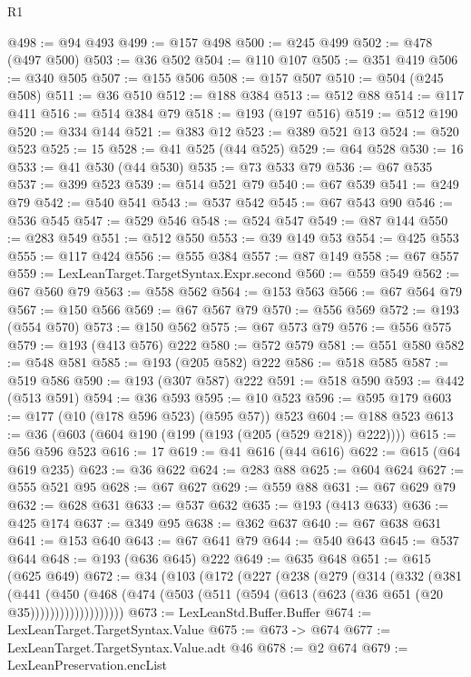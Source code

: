 \begin{lexlean}{R1}
\begin{coremodule}
@498 := @94 @493
@499 := @157 @498
@500 := @245 @499
@502 := @478 (@497 @500)
@503 := @36 @502
@504 := @110 @107
@505 := @351 @419
@506 := @340 @505
@507 := @155 @506
@508 := @157 @507
@510 := @504 (@245 @508)
@511 := @36 @510
@512 := @188 @384
@513 := @512 @88
@514 := @117 @411
@516 := @514 @384 @79
@518 := @193 (@197 @516)
@519 := @512 @190
@520 := @334 @144
@521 := @383 @12
@523 := @389 @521 @13
@524 := @520 @523
@525 := 15
@528 := @41 @525 (@44 @525)
@529 := @64 @528
@530 := 16
@533 := @41 @530 (@44 @530)
@535 := @73 @533 @79
@536 := @67 @535
@537 := @399 @523
@539 := @514 @521 @79
@540 := @67 @539
@541 := @249 @79
@542 := @540 @541
@543 := @537 @542
@545 := @67 @543 @90
@546 := @536 @545
@547 := @529 @546
@548 := @524 @547
@549 := @87 @144
@550 := @283 @549
@551 := @512 @550
@553 := @39 @149 @53
@554 := @425 @553
@555 := @117 @424
@556 := @555 @384
@557 := @87 @149
@558 := @67 @557
@559 := LexLeanTarget.TargetSyntax.Expr.second
@560 := @559 @549
@562 := @67 @560 @79
@563 := @558 @562
@564 := @153 @563
@566 := @67 @564 @79
@567 := @150 @566
@569 := @67 @567 @79
@570 := @556 @569
@572 := @193 (@554 @570)
@573 := @150 @562
@575 := @67 @573 @79
@576 := @556 @575
@579 := @193 (@413 @576) @222
@580 := @572 @579
@581 := @551 @580
@582 := @548 @581
@585 := @193 (@205 @582) @222
@586 := @518 @585
@587 := @519 @586
@590 := @193 (@307 @587) @222
@591 := @518 @590
@593 := @442 (@513 @591)
@594 := @36 @593
@595 := @10 @523
@596 := @595 @179
@603 := @177 (@10 (@178 @596 @523) (@595 @57)) @523
@604 := @188 @523
@613 := @36 (@603 (@604 @190 (@199 (@193 (@205 (@529 @218)) @222))))
@615 := @56 @596 @523
@616 := 17
@619 := @41 @616 (@44 @616)
@622 := @615 (@64 @619 @235)
@623 := @36 @622
@624 := @283 @88
@625 := @604 @624
@627 := @555 @521 @95
@628 := @67 @627
@629 := @559 @88
@631 := @67 @629 @79
@632 := @628 @631
@633 := @537 @632
@635 := @193 (@413 @633)
@636 := @425 @174
@637 := @349 @95
@638 := @362 @637
@640 := @67 @638 @631
@641 := @153 @640
@643 := @67 @641 @79
@644 := @540 @643
@645 := @537 @644
@648 := @193 (@636 @645) @222
@649 := @635 @648
@651 := @615 (@625 @649)
@672 := @34
    (@103
      (@172
        (@227
          (@238
            (@279
              (@314
                (@332
                  (@381
                    (@441
                      (@450
                        (@468
                          (@474 (@503 (@511 (@594 (@613 (@623 (@36 @651 (@20 @35)))))))))))))))))))
@673 := LexLeanStd.Buffer.Buffer
@674 := LexLeanTarget.TargetSyntax.Value
@675 := @673 -> @674
@677 := LexLeanTarget.TargetSyntax.Value.adt @46
@678 := @2 @674
@679 := LexLeanPreservation.encList

\end{coremodule}
\end{lexlean}

